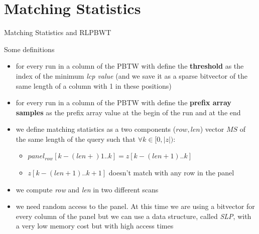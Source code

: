 \documentclass{beamer}
\begin{document}
\section{Matching Statistics}
\begin{frame}{Matching Statistics and RLPBWT}
  \begin{block}{Some definitions}
    \small
    \begin{itemize}
      \item for every run in a column of the PBTW with define the
      \textbf{threshold} as the index of the minimum \textit{lcp value} (and we
      save it as a sparse bitvector of the same length of a column with 1 in
      these positions)
      \item for every run in a column of the PBTW with define the
      \textbf{prefix array samples} as the prefix array value at the begin of the
      run and at the end
      \item we define matching statistics as a two components ($row, len$) vector $MS$ of the
      same length of the query such that $\forall k\in[0,|z|)$: 
      \begin{itemize}
        \item $panel_{row}[k-(len+)1..k]=z[k-(len+1)..k]$
        \item $z[k-(len+1)..k+1]$ doesn't match with any row in the panel 
      \end{itemize}
      \item we compute \textit{row} and \textit{len} in two different scans
      \item we need random access to the panel. At this time we are using a
      bitvector for every column of the panel but we can use a data structure,
      called \textit{SLP}, with a very low memory cost but with high access
      times  
      
    \end{itemize}
  \end{block}
\end{frame}
\end{document}
